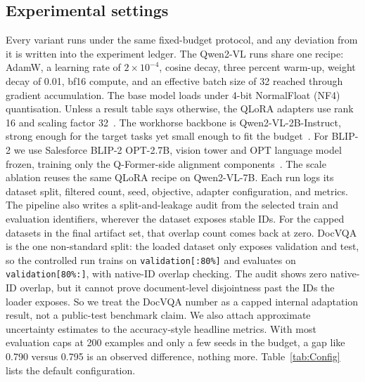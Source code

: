 \documentclass[preprint,12pt]{elsarticle}
\begin{document}
\subsection{Experimental settings}
Every variant runs under the same fixed-budget protocol, and any deviation from it is written into the experiment ledger.
The Qwen2-VL runs share one recipe: AdamW, a learning rate of $2 \times 10^{-4}$, cosine decay, three percent warm-up, weight decay of 0.01, bf16 compute, and an effective batch size of 32 reached through gradient accumulation.
The base model loads under 4-bit NormalFloat (NF4) quantisation.
Unless a result table says otherwise, the QLoRA adapters use rank 16 and scaling factor 32~\cite{hu2022lora,dettmers2023qlora}.
The workhorse backbone is Qwen2-VL-2B-Instruct, strong enough for the target tasks yet small enough to fit the budget~\cite{wang2024qwen2vl}.
For BLIP-2 we use Salesforce BLIP-2 OPT-2.7B, vision tower and OPT language model frozen, training only the Q-Former-side alignment components~\cite{li2023blip2}.
The scale ablation reuses the same QLoRA recipe on Qwen2-VL-7B.
Each run logs its dataset split, filtered count, seed, objective, adapter configuration, and metrics.
The pipeline also writes a split-and-leakage audit from the selected train and evaluation identifiers, wherever the dataset exposes stable IDs.
For the capped datasets in the final artifact set, that overlap count comes back at zero.
DocVQA is the one non-standard split: the loaded dataset only exposes validation and test, so the controlled run trains on \texttt{validation[:80\%]} and evaluates on \texttt{validation[80\%:]}, with native-ID overlap checking.
The audit shows zero native-ID overlap, but it cannot prove document-level disjointness past the IDs the loader exposes.
So we treat the DocVQA number as a capped internal adaptation result, not a public-test benchmark claim.
We also attach approximate uncertainty estimates to the accuracy-style headline metrics.
With most evaluation caps at 200 examples and only a few seeds in the budget, a gap like 0.790 versus 0.795 is an observed difference, nothing more.
Table~\ref{tab:Config} lists the default configuration.
\end{document}
